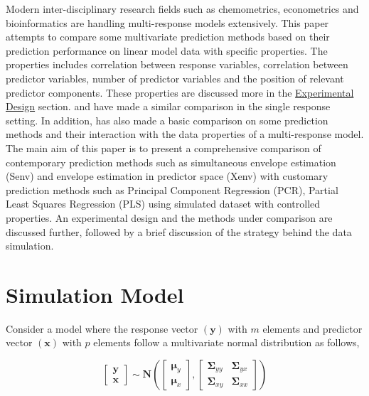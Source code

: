 \documentclass[12pt,3p,authoryear]{elsarticle}
\begin{document}
Modern inter-disciplinary research fields such as chemometrics,
econometrics and bioinformatics are handling multi-response models
extensively. This paper attempts to compare some multivariate prediction
methods based on their prediction performance on linear model data with
specific properties. The properties includes correlation between
response variables, correlation between predictor variables, number of
predictor variables and the position of relevant predictor components.
These properties are discussed more in the
\protect\hyperlink{experimental-design}{Experimental Design} section.
\citet{saebo2015simrel} and \citet{Alm_y_1996} have made a similar
comparison in the single response setting. In addition,
\citet{Rimal2018} has also made a basic comparison on some prediction
methods and their interaction with the data properties of a
multi-response model. The main aim of this paper is to present a
comprehensive comparison of contemporary prediction methods such as
simultaneous envelope estimation (Senv) \citep{cook2015simultaneous} and
envelope estimation in predictor space (Xenv) \citep{cook2010envelope}
with customary prediction methods such as Principal Component Regression
(PCR), Partial Least Squares Regression (PLS) using simulated dataset
with controlled properties. An experimental design and the methods under
comparison are discussed further, followed by a brief discussion of the
strategy behind the data simulation.

\hypertarget{simulation-model}{%
\section{Simulation Model}\label{simulation-model}}

Consider a model where the response vector \((\mathbf{y})\) with \(m\)
elements and predictor vector \((\mathbf{x})\) with \(p\) elements
follow a multivariate normal distribution as follows,

\begin{equation}
  \begin{bmatrix}
    \mathbf{y} \\ \mathbf{x}
  \end{bmatrix} \sim \mathbf{N}
  \left(
    \begin{bmatrix}
      \boldsymbol{\mu}_y \\
      \boldsymbol{\mu}_x
    \end{bmatrix},
    \begin{bmatrix}
    \boldsymbol{\Sigma}_{yy} & \boldsymbol{\Sigma}_{yx} \\
    \boldsymbol{\Sigma}_{xy} & \boldsymbol{\Sigma}_{xx}
    \end{bmatrix}
  \right)
  \label{eq:model-1}
\end{equation}
\end{document}
